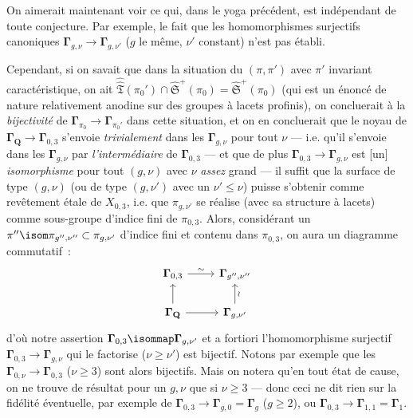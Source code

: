 On aimerait maintenant voir ce qui, dans le yoga précédent, est indépendant de toute conjecture. Par exemple, le fait que les homomorphismes surjectifs canoniques $\boldsymbol{\Gamma}_{g,\nu}\to \boldsymbol{\Gamma}_{g,\nu'}$ ($g$ le même, $\nu'$ constant) n'est pas établi. 

Cependant, si on savait que dans la situation du $(\pi,\pi')$ avec $\pi'$ invariant caractéristique, on ait $\hat{\hat{\mathfrak{T}}}(\pi_0')\cap \hat{\mathfrak{S}}^+(\pi_0)=\hat{\mathfrak{S}}^+(\pi_0)$ (qui est un énoncé de nature relativement anodine sur des groupes à lacets profinis), on concluerait à la \emph{bijectivité} de $\boldsymbol{\Gamma}_{\pi_0}\to\boldsymbol{\Gamma}_{\pi_0'}$ dans cette situation, et on en concluerait que le noyau de $\boldsymbol{\Gamma}_\mathbf{Q}\to\boldsymbol{\Gamma}_{0,3}$ s'envoie \emph{trivialement} dans les $\boldsymbol{\Gamma}_{g,\nu}$ pour tout $\nu$ --- i.e. qu'il s'envoie dans les $\boldsymbol{\Gamma}_{g,\nu}$ par \emph{l'intermédiaire} de $\boldsymbol{\Gamma}_{0,3}$ --- et que de plus $\boldsymbol{\Gamma}_{0,3}\to\boldsymbol{\Gamma}_{g,\nu}$ est [un] \emph{isomorphisme} pour tout $(g,\nu)$ avec $\nu$ \emph{assez} grand --- il suffit que la surface de type $(g,\nu)$ (ou de type $(g,\nu')$ avec un $\nu'\le \nu$) puisse s'obtenir comme revêtement étale de $X_{0,3}$, i.e. que $\pi_{g,\nu'}$ se réalise (avec sa structure à lacets) comme sous-groupe d'indice fini de $\pi_{0,3}$. Alors, considérant un $\pi'' \isom \pi_{g'',\nu''}\subset \pi_{g,\nu'}$ d'indice fini et contenu dans $\pi_{0,3}$, on aura un diagramme commutatif~:
\[\begin{tikzcd}
	{\boldsymbol{\Gamma}_{0, 3}} & {\boldsymbol{\Gamma}_{g'', \nu''}} \\
	{\boldsymbol{\Gamma}_{\mathbf{Q}}} & {\boldsymbol{\Gamma}_{g, \nu'}}
	\arrow["\sim", from=1-1, to=1-2]
	\arrow[from=2-1, to=1-1]
	\arrow[from=2-1, to=2-2]
	\arrow["\wr"', from=2-2, to=1-2]
\end{tikzcd}\]
d'où notre assertion $\boldsymbol{\Gamma}_{0,3}\isommap\boldsymbol{\Gamma}_{g,\nu'}$ et a fortiori l'homomorphisme surjectif $\boldsymbol{\Gamma}_{0,3}\to \boldsymbol{\Gamma}_{g,\nu}$ qui le factorise ($\nu\ge\nu'$) est bijectif. Notons par exemple que les $\boldsymbol{\Gamma}_{0,\nu}\to\boldsymbol{\Gamma}_{0,3}$ ($\nu\ge 3$) sont alors bijectifs.  Mais on notera qu'en tout état de cause, on ne trouve de résultat pour un $g,\nu$ que si $\nu\ge 3$ --- donc ceci ne dit rien sur la fidélité éventuelle, par exemple de $\boldsymbol{\Gamma}_{0,3}\to\boldsymbol{\Gamma}_{g,0}=\boldsymbol{\Gamma}_g$ ($g\ge 2$), ou $\boldsymbol{\Gamma}_{0,3}\to\boldsymbol{\Gamma}_{1,1}=\boldsymbol{\Gamma}_1$.

